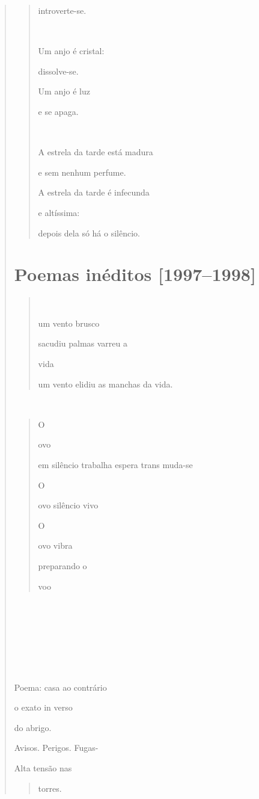 \begin{verse}
\begin{quote}
introverte-se.



Um anjo é cristal:

dissolve-se.

Um anjo é luz

e se apaga.



A estrela da tarde está madura

e sem nenhum perfume.

A estrela da tarde é infecunda

e altíssima:

depois dela só há o silêncio.
\end{quote}

\section{Poemas inéditos {[}1997--1998{]}}\label{poemas-inuxe9ditos}

\begin{quote}


um vento brusco

sacudiu palmas varreu a

vida

um vento elidiu as manchas da vida.
\end{quote}



\begin{quote}
O

ovo

em silêncio trabalha espera trans muda-se

O

ovo silêncio vivo

O

ovo vibra

preparando o

voo
\end{quote}









Poema: casa ao contrário

o exato in verso

do abrigo.

Avisos. Perigos. Fugas-

Alta tensão nas

\begin{quote}
torres.


\end{quote}
\end{verse}
